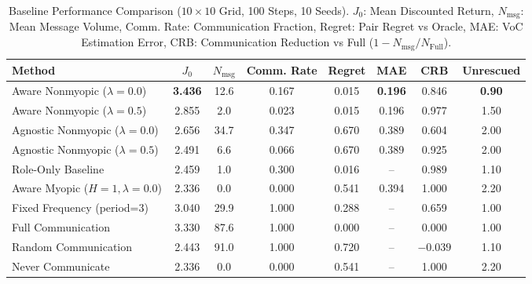 \begin{table}[t]
\centering
\small
\caption{Baseline Performance Comparison ($10\times 10$ Grid, 100 Steps, 10 Seeds). $J_0$: Mean Discounted Return, $N_{\mathrm{msg}}$: Mean Message Volume, Comm. Rate: Communication Fraction, Regret: Pair Regret vs Oracle, MAE: VoC Estimation Error, CRB: Communication Reduction vs Full ($1 - N_{\mathrm{msg}}/N_{\mathrm{Full}}$).}
\label{tab:baseline_comparison}
\begin{tabular}{lccccccc}
\toprule
Method & $J_0$ & $N_{\mathrm{msg}}$ & Comm. Rate & Regret & MAE & CRB & Unrescued \\
\midrule
Aware Nonmyopic ($\lambda=0.0$) & \textbf{3.436} & 12.6 & 0.167 & 0.015 & \textbf{0.196} & 0.846 & \textbf{0.90} \\
Aware Nonmyopic ($\lambda=0.5$) & 2.855 & 2.0 & 0.023 & 0.015 & 0.196 & 0.977 & 1.50 \\
Agnostic Nonmyopic ($\lambda=0.0$) & 2.656 & 34.7 & 0.347 & 0.670 & 0.389 & 0.604 & 2.00 \\
Agnostic Nonmyopic ($\lambda=0.5$) & 2.491 & 6.6 & 0.066 & 0.670 & 0.389 & 0.925 & 2.00 \\
Role-Only Baseline & 2.459 & 1.0 & 0.300 & 0.016 & -- & 0.989 & 1.10 \\
Aware Myopic ($H=1, \lambda=0.0$) & 2.336 & 0.0 & 0.000 & 0.541 & 0.394 & 1.000 & 2.20 \\
Fixed Frequency (period=3) & 3.040 & 29.9 & 1.000 & 0.288 & -- & 0.659 & 1.00 \\
Full Communication & 3.330 & 87.6 & 1.000 & 0.000 & -- & 0.000 & 1.00 \\
Random Communication & 2.443 & 91.0 & 1.000 & 0.720 & -- & $-0.039$ & 1.10 \\
Never Communicate & 2.336 & 0.0 & 0.000 & 0.541 & -- & 1.000 & 2.20 \\
\bottomrule
\end{tabular}
\end{table}
